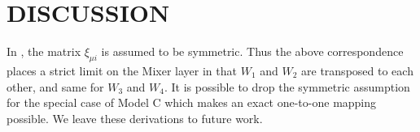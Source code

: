 \documentclass[letterpaper, 10 pt, conference]{ieeeconf}  %
\begin{document}
\section{DISCUSSION}
\noindent
In \cite{krotov2021large}, the matrix $\xi_{\mu i}$ is assumed to be symmetric. Thus the above correspondence places a strict limit on the Mixer layer in that $W_1$ and $W_2$ are transposed to each other, and same for $W_3$ and $W_4$. It is possible to drop the symmetric assumption for the special case of Model C which makes an exact one-to-one mapping possible. We leave these derivations to future work.




\end{document}
